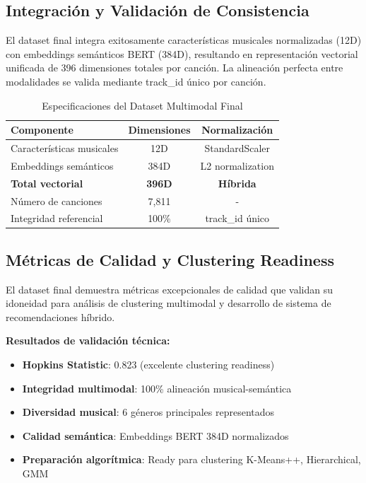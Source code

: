 \documentclass[12pt,a4paper]{report}
\begin{document}
\subsection{Integración y Validación de Consistencia}

El dataset final integra exitosamente características musicales normalizadas (12D) con embeddings semánticos BERT (384D), resultando en representación vectorial unificada de 396 dimensiones totales por canción. La alineación perfecta entre modalidades se valida mediante track\_id único por canción.

\begin{table}[H]
\centering
\caption{Especificaciones del Dataset Multimodal Final}
\begin{tabular}{|l|c|c|}
\hline
\textbf{Componente} & \textbf{Dimensiones} & \textbf{Normalización} \\
\hline
Características musicales & 12D & StandardScaler \\
\hline
Embeddings semánticos & 384D & L2 normalization \\
\hline
\textbf{Total vectorial} & \textbf{396D} & \textbf{Híbrida} \\
\hline
Número de canciones & 7,811 & - \\
\hline
Integridad referencial & 100\% & track\_id único \\
\hline
\end{tabular}
\end{table}

\subsection{Métricas de Calidad y Clustering Readiness}

El dataset final demuestra métricas excepcionales de calidad que validan su idoneidad para análisis de clustering multimodal y desarrollo de sistema de recomendaciones híbrido.

\textbf{Resultados de validación técnica:}
\begin{itemize}
    \item \textbf{Hopkins Statistic}: 0.823 (excelente clustering readiness)
    \item \textbf{Integridad multimodal}: 100\% alineación musical-semántica
    \item \textbf{Diversidad musical}: 6 géneros principales representados
    \item \textbf{Calidad semántica}: Embeddings BERT 384D normalizados
    \item \textbf{Preparación algorítmica}: Ready para clustering K-Means++, Hierarchical, GMM
\end{itemize}
\end{document}
